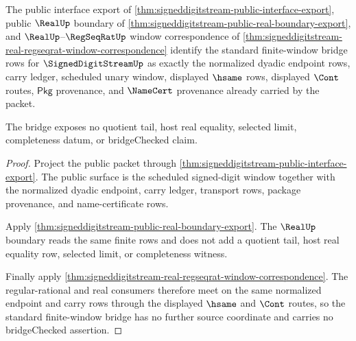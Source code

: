 \begin{theorem}
\label{thm:signeddigitstream-standard-bridge-window}
The public interface export of
\autoref{thm:signeddigitstream-public-interface-export}, public $\RealUp$
boundary of \autoref{thm:signeddigitstream-public-real-boundary-export}, and
$\RealUp$--$\RegSeqRatUp$ window correspondence of
\autoref{thm:signeddigitstream-real-regseqrat-window-correspondence} identify
the standard finite-window bridge rows for $\SignedDigitStreamUp$ as exactly
the normalized dyadic endpoint rows, carry ledger, scheduled unary window,
displayed $\hsame$ rows, displayed $\Cont$ routes, $\mathsf{Pkg}$ provenance,
and $\NameCert$ provenance already carried by the packet.

The bridge exposes no quotient tail, host real equality, selected limit,
completeness datum, or bridgeChecked claim.
\end{theorem}
\begin{proof}
Project the public packet through
\autoref{thm:signeddigitstream-public-interface-export}. The public surface is
the scheduled signed-digit window together with the normalized dyadic endpoint,
carry ledger, transport rows, package provenance, and name-certificate rows.

Apply \autoref{thm:signeddigitstream-public-real-boundary-export}. The
$\RealUp$ boundary reads the same finite rows and does not add a quotient tail,
host real equality row, selected limit, or completeness witness.

Finally apply
\autoref{thm:signeddigitstream-real-regseqrat-window-correspondence}. The
regular-rational and real consumers therefore meet on the same normalized
endpoint and carry rows through the displayed $\hsame$ and $\Cont$ routes, so
the standard finite-window bridge has no further source coordinate and carries
no bridgeChecked assertion.
\end{proof}

